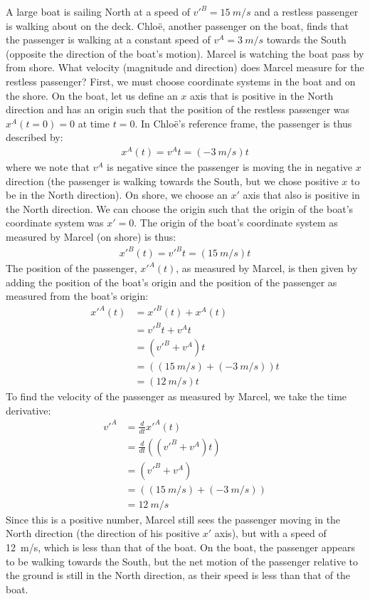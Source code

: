 \begin{example}{A large boat is sailing North at a speed of $v'^B=\SI{15}{m/s}$ and a restless passenger is walking about on the deck. Chlo\"e, another passenger on the boat, finds that the passenger is walking at a constant speed of $v^A=\SI{3}{m/s}$ towards the South (opposite the direction of the boat's motion). Marcel is watching the boat pass by from shore. What velocity (magnitude and direction) does Marcel measure for the restless passenger?}
First, we must choose coordinate systems in the boat and on the shore. On the boat, let us define an $x$ axis that is positive in the North direction and has an origin such that the position of the restless passenger was $x^A(t=0)=0$ at time $t=0$. In Chlo\"e's reference frame, the passenger is thus described by:
\begin{align*}
x^A(t)=v^At=(\SI{-3}{m/s})t
\end{align*}
where we note that $v^A$ is negative since the passenger is moving the in negative $x$ direction (the passenger is walking towards the South, but we chose positive $x$ to be in the North direction). On shore, we choose an $x'$ axis that also is positive in the North direction. We can choose the origin such that the origin of the boat's coordinate system was $x'=0$. The origin of the boat's coordinate system as measured by Marcel (on shore) is thus:
\begin{align*}
x'^B(t)=v'^Bt=(\SI{15}{m/s})t
\end{align*}
The position of the passenger, $x'^A(t)$, as measured by Marcel, is then given by adding the position of the boat's origin and the position of the passenger as measured from the boat's origin:
\begin{align*}
x'^A(t) &= x'^B(t)+x^A(t)\\
&= v'^Bt + v^At \\
&= (v'^B+v^A)t\\
&= ((\SI{15}{m/s})+(\SI{-3}{m/s}))t\\
&= (\SI{12}{m/s})t
\end{align*}
To find the velocity of the passenger as measured by Marcel, we take the time derivative:
\begin{align*}
v'^A &= \frac{d}{dt}x'^A(t)\\
&= \frac{d}{dt} \left((v'^B+v^A)t\right)\\
&=(v'^B+v^A)\\
&=((\SI{15}{m/s})+(\SI{-3}{m/s}))\\
&=\SI{12}{m/s}
\end{align*}
Since this is a positive number, Marcel still sees the passenger moving in the North direction (the direction of his positive $x'$ axis), but with a speed of \SI{12}{m/s}, which is less than that of the boat. On the boat, the passenger appears to be walking towards the South, but the net motion of the passenger relative to the ground is still in the North direction, as their speed is less than that of the boat.
\end{example}

